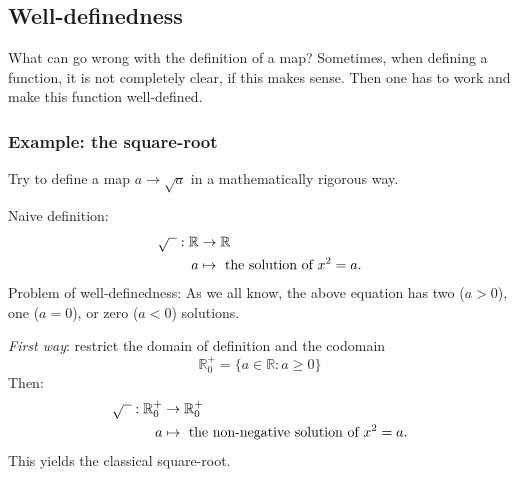 \subsection*{Well-definedness}
What can go wrong with the definition of a map? 
Sometimes, when defining a function, it is not completely clear, if this makes sense. 
Then one has to work and make this function well-defined. 

\subsubsection{Example: the square-root}

Try to define a map $a \to \sqrt{a}$ in a mathematically rigorous way.

Naive definition:
\begin{align*}
 \sqrt{\hphantom{x}} : \mathbb{R} &\to \mathbb{R}\\
         a &\mapsto \mbox{ the solution of } x^2=a.
\end{align*}
Problem of well-definedness: As we all know, the above equation has two ($a>0$), one ($a=0$), or zero ($a<0$) solutions.

\emph{First way}: restrict the domain of definition and the codomain
\[
 \mathbb{R}^+_0 =  \{ a \in \mathbb{R}: a \ge 0 \}
\]
Then:
\begin{align*}
 \sqrt{\hphantom{x}} : \mathbb{R}^+_0 &\to \mathbb{R}^+_0\\
         a &\mapsto  \mbox{ the non-negative solution of } x^2=a.
\end{align*}
This yields the classical square-root. 
